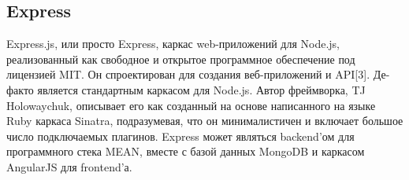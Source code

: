 \subsection{Express}

Express.js, или просто Express, каркас web-приложений для Node.js, реализованный как свободное и открытое программное обеспечение под лицензией MIT. Он спроектирован для создания веб-приложений и API[3]. Де-факто является стандартным каркасом для Node.js. Автор фреймворка, TJ Holowaychuk, описывает его как созданный на основе написанного на языке Ruby каркаса Sinatra, подразумевая, что он минималистичен и включает большое число подключаемых плагинов. Express может являться backend'ом для программного стека MEAN, вместе с базой данных MongoDB и каркасом AngularJS для frontend'а.